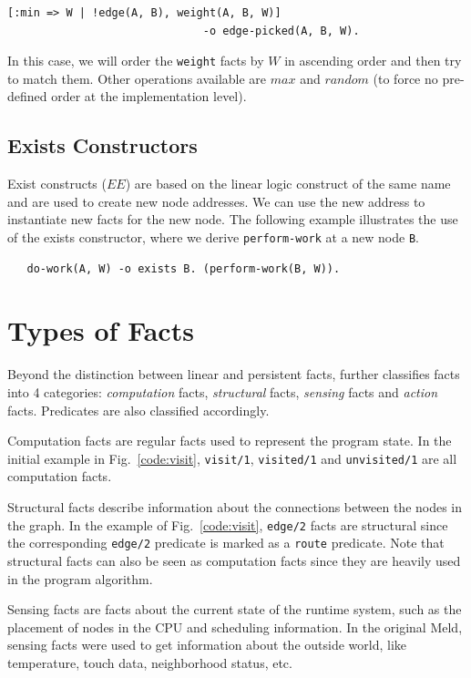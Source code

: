 \begin{Verbatim}
[:min => W | !edge(A, B), weight(A, B, W)]
                              -o edge-picked(A, B, W).
\end{Verbatim}

In this case, we will order the \texttt{weight} facts by $W$ in ascending order and then try
to match them. Other operations available are $max$ and $random$ (to force no pre-defined order at the
implementation level).

\subsection{Exists Constructors}

Exist constructs ($EE$) are based on the linear logic construct of the same name and are used to create new node addresses. We can use the new address to instantiate new facts for the new node.  
The following example illustrates the use of the exists constructor, where we derive
\texttt{perform-work} at a new node \texttt{B}.

\begin{Verbatim}
   do-work(A, W) -o exists B. (perform-work(B, W)).
\end{Verbatim}

\section{Types of Facts}

Beyond the distinction between linear and persistent facts, \lang further classifies facts
into 4 categories: \emph{computation} facts, \emph{structural} facts, \emph{sensing} facts
and \emph{action} facts. Predicates are also classified accordingly.

Computation facts are regular facts used to represent the program state. In the initial
example in Fig.~\ref{code:visit}, \texttt{visit/1}, \texttt{visited/1} and \texttt{unvisited/1}
are all computation facts.

Structural facts describe information about the connections between the nodes in the graph.
In the example of Fig.~\ref{code:visit}, \texttt{edge/2} facts are structural since the
corresponding \texttt{edge/2} predicate is
marked as a \texttt{route} predicate. Note that structural facts can also be seen as
computation facts since they are heavily used in the program algorithm.

Sensing facts are facts about the current state of the runtime system, such as the placement
of nodes in the CPU and scheduling information. In the original Meld, sensing facts
were used to get information about the outside world, like temperature, touch data,
neighborhood status, etc.

